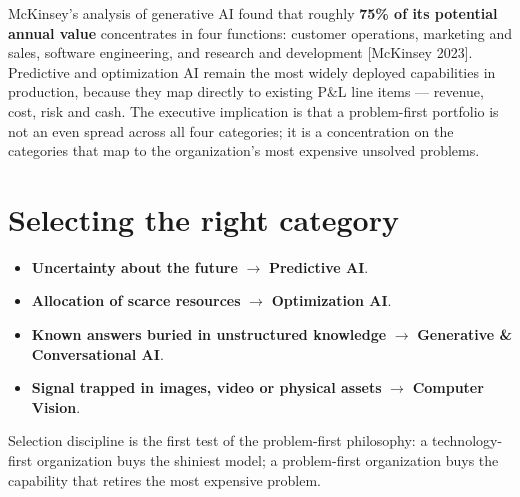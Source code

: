 McKinsey's analysis of generative AI found that roughly \textbf{75\% of its
potential annual value} concentrates in four functions: customer operations,
marketing and sales, software engineering, and research and development
[McKinsey 2023]. Predictive and optimization AI remain the most widely
deployed capabilities in production, because they map directly to existing
P\&L line items — revenue, cost, risk and cash. The executive implication is
that a problem-first portfolio is not an even spread across all four
categories; it is a concentration on the categories that map to the
organization's most expensive unsolved problems.

\section{Selecting the right category}

\begin{itemize}
  \item \textbf{Uncertainty about the future} $\rightarrow$ \textbf{Predictive AI}.
  \item \textbf{Allocation of scarce resources} $\rightarrow$ \textbf{Optimization AI}.
  \item \textbf{Known answers buried in unstructured knowledge} $\rightarrow$ \textbf{Generative \& Conversational AI}.
  \item \textbf{Signal trapped in images, video or physical assets} $\rightarrow$ \textbf{Computer Vision}.
\end{itemize}

Selection discipline is the first test of the problem-first philosophy: a
technology-first organization buys the shiniest model; a problem-first
organization buys the capability that retires the most expensive problem.
